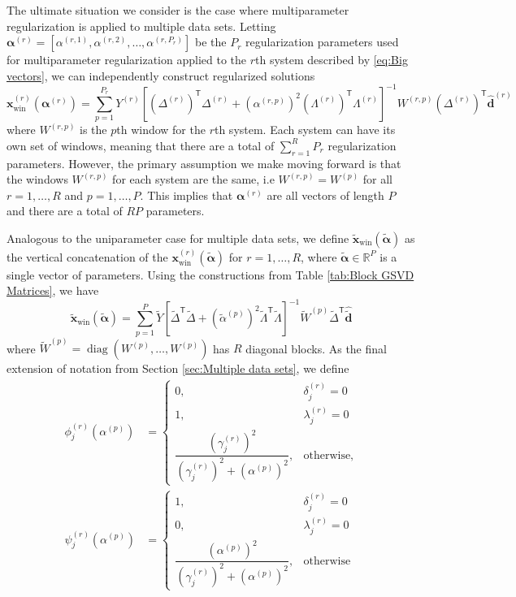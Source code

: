 \documentclass[12pt]{article}
\newcommand{\dVec}{\mathbf{d}}	%
\newcommand{\xVec}{\mathbf{x}}	%
\newcommand{\trans}[1]{{#1}^\mathsf{T}}	%
\newcommand{\inv}[1]{{#1}^{-1}}	%
\DeclareMathOperator{\diag}{diag}	%
\newcommand{\dft}[1]{\widehat{#1}}	%
\newcommand{\regparam}{\alpha}  %
\newcommand{\regparamVec}{\bm{\regparam}}   %
\newcommand{\regparamVecBig}{\widetilde{\regparamVec}}   %
\newcommand{\xWin}{\xVec_{\text{win}}}	%
\newcommand{\xBig}{\widetilde{\xVec}}	%
\newcommand{\xWinBig}{\xBig_{\text{win}}}	%
\newcommand{\dBig}{\widetilde{\dVec}}	%
\newcommand{\filt}{\phi}
\newcommand{\mfilt}{\psi}
\begin{document}
The ultimate situation we consider is the case where multiparameter regularization is applied to multiple data sets. Letting $\regparamVec^{(r)} = [\regparam^{(r,1)},\regparam^{(r,2)},\ldots,\regparam^{(r,P_r)}]$ be the $P_r$ regularization parameters used for multiparameter regularization applied to the $r$th system described by \eqref{eq:Big vectors}, we can independently construct regularized solutions
\[\xWin^{(r)}\left(\regparamVec^{(r)}\right) = \sum_{p=1}^{P_r} Y^{(r)}\inv{\left[\trans{\left(\Delta^{(r)}\right)}\Delta^{(r)} + \left(\regparam^{(r,p)}\right)^2 \trans{\left(\Lambda^{(r)}\right)}\Lambda^{(r)}\right]}W^{(r,p)}\trans{\left(\Delta^{(r)}\right)}\dft{\dVec}^{(r)}\]
where $W^{(r,p)}$ is the $p$th window for the $r$th system. Each system can have its own set of windows, meaning that there are a total of $\sum_{r=1}^{R} P_r$ regularization parameters. However, the primary assumption we make moving forward is that the windows $W^{(r,p)}$ for each system are the same, i.e $W^{(r,p)} = W^{(p)}$ for all $r = 1,\ldots,R$ and $p = 1,\ldots,P$. This implies that $\regparamVec^{(r)}$ are all vectors of length $P$ and there are a total of $RP$ parameters. \par
Analogous to the uniparameter case for multiple data sets, we define $\xWinBig(\regparamVecBig)$ as the vertical concatenation of the $\xWin^{(r)}\left(\regparamVecBig\right)$ for $r = 1,\ldots,R$, where $\regparamVecBig \in \mathbb{R}^P$ is a single vector of parameters. Using the constructions from Table \ref{tab:Block GSVD Matrices}, we have
\begin{equation}
\label{eq:Big Windowed Solution}
    \xWinBig(\regparamVecBig) = \sum_{p=1}^{P} \widetilde{Y}\inv{\left[\trans{\widetilde{\Delta}}\widetilde{\Delta} + \left(\widetilde{\regparam}^{(p)}\right)^2 \trans{\widetilde{\Lambda}}\widetilde{\Lambda}\right]}\widetilde{W}^{(p)}\trans{\widetilde{\Delta}}\dft{\dBig}
\end{equation}
where $\widetilde{W}^{(p)} = \diag(W^{(p)},\ldots,W^{(p)})$ has $R$ diagonal blocks. As the final extension of notation from Section \ref{sec:Multiple data sets}, we define
\begin{align*}
    \filt_j^{(r)}\left(\regparam^{(p)}\right) &= \begin{cases}
0, & \delta_j^{(r)} = 0 \\
1, & \lambda_j^{(r)} = 0 \\
\dfrac{\left(\gamma_j^{(r)}\right)^2}{\left(\gamma_j^{(r)}\right)^2 + \left(\regparam^{(p)}\right)^2}, & \text{otherwise,}
\end{cases} \\
\mfilt_j^{(r)}\left(\regparam^{(p)}\right) &= \begin{cases}
1, & \delta_j^{(r)} = 0 \\
0, & \lambda_j^{(r)} = 0 \\
\dfrac{\left(\regparam^{(p)}\right)^2}{\left(\gamma_j^{(r)}\right)^2 + \left(\regparam^{(p)}\right)^2}, & \text{otherwise}
\end{cases}
\end{align*}
\end{document}
